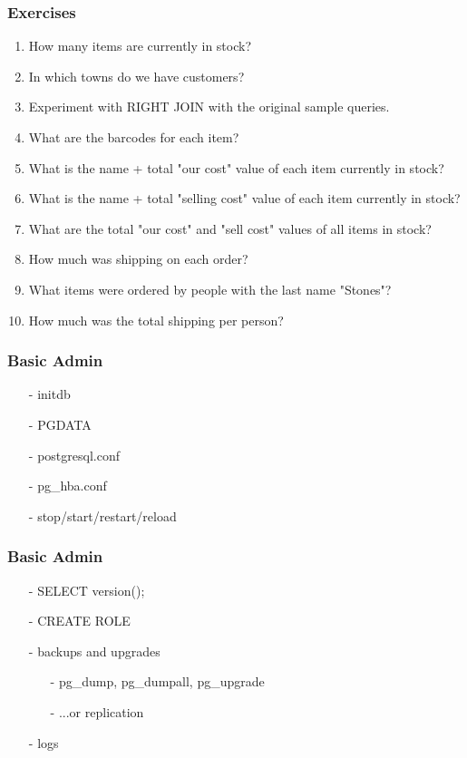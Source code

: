 \documentclass[20pt]{beamer}
\begin{document}

\frame
{
    \frametitle{Exercises}
    \begin{enumerate}
    \small
    \item How many items are currently in stock?
    \item In which towns do we have customers?
    \item Experiment with RIGHT JOIN with the original sample queries.
    \item What are the barcodes for each item?
    \item What is the name + total "our cost" value of each item currently in stock?
    \item What is the name + total "selling cost" value of each item currently in stock?
    \item What are the total "our cost" and "sell cost" values of all items in stock?
    \item How much was shipping on each order?
    \item What items were ordered by people with the last name "Stones"?
    \item How much was the total shipping per person?
    \end{enumerate}
}

\frame
{
    \frametitle{Basic Admin}
    \begin{itemize}
    \item[-] initdb
    \item[-] PGDATA
    \item[-] postgresql.conf
    \item[-] pg\_hba.conf
    \item[-] stop/start/restart/reload
    \end{itemize}
}

\frame
{
    \frametitle{Basic Admin}
    \begin{itemize}
    \item[-] SELECT version();
    \item[-] CREATE ROLE
    \item[-] backups and upgrades
        \begin{itemize}
        \item[-] pg\_dump, pg\_dumpall, pg\_upgrade
        \item[-] ...or replication
        \end{itemize}
    \item[-] logs 
    \end{itemize}
}
\end{document}

